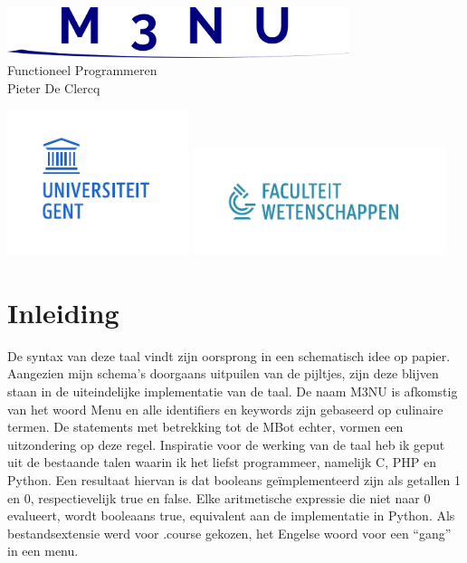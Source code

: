 \documentclass[12pt,a4paper]{report}
\begin{document}

\vspace*{\fill}
\begin{center}
\includegraphics[width=100mm]{verslag/logo.png}
\vspace*{1.5in}\\
  {\Huge Functioneel Programmeren}\\
  {\Large Pieter De Clercq}
\end{center}
\vspace*{\fill}
\begin{center}
\includegraphics[width=53mm]{verslag/logo-ugent.pdf}
\includegraphics[width=74mm]{verslag/logo-we.pdf}
\end{center}
\tableofcontents
\newpage
\chapter{Inleiding}
De syntax van deze taal vindt zijn oorsprong in een schematisch idee op papier. Aangezien mijn schema's doorgaans uitpuilen van de pijltjes, zijn deze blijven staan in de uiteindelijke implementatie van de taal. De naam M3NU is afkomstig van het woord Menu en alle identifiers en keywords zijn gebaseerd op culinaire termen. De statements met betrekking tot de MBot echter, vormen een uitzondering op deze regel. Inspiratie voor de werking van de taal heb ik geput uit de bestaande talen waarin ik het liefst programmeer, namelijk C, PHP en Python. Een resultaat hiervan is dat booleans geïmplementeerd zijn als getallen 1 en 0, respectievelijk true en false. Elke aritmetische expressie die niet naar 0 evalueert, wordt booleaans true, equivalent aan de implementatie in Python. Als bestandsextensie werd voor .course gekozen, het Engelse woord voor een ``gang'' in een menu.
\end{document}

